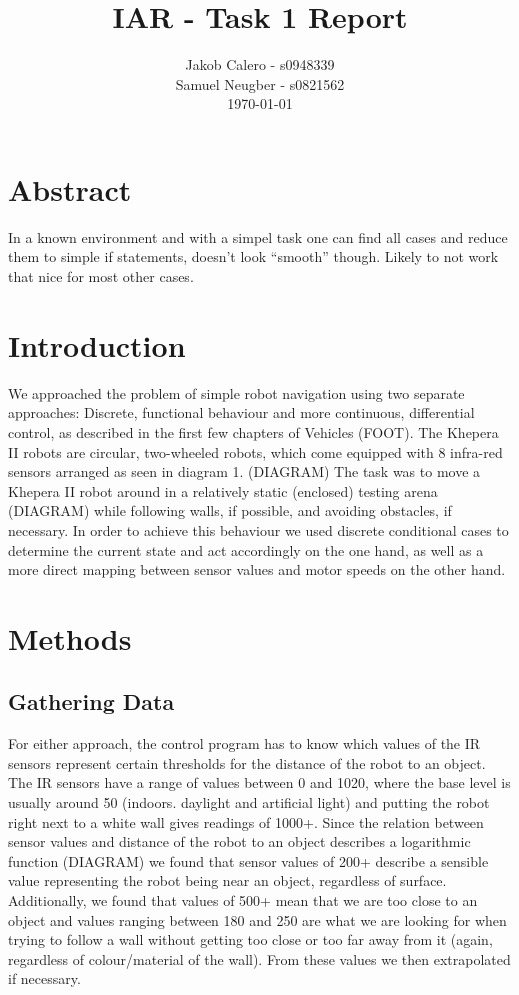 \documentclass[paper=a4, fontsize=12pt]{scrartcl}	%
\title{
\usefont{OT1}{bch}{b}{n}
\large IAR - Task 1 Report \\
}
\author{
\normalfont \normalsize
        Jakob Calero - s0948339\\[-3pt]\normalsize
	Samuel Neugber - s0821562\\[-3pt]\normalsize
        \today
}
\date{}
\numberwithin{equation}{section}		%
\numberwithin{figure}{section}			%
\numberwithin{table}{section}				%
\begin{document}
\maketitle
\section{Abstract}
In a known environment and with a simpel task one can find all cases and reduce them to simple if statements, doesn't look “smooth” though. Likely to not work that nice for most other cases.

\section{Introduction}
We approached the problem of simple robot navigation using two separate approaches: Discrete, functional behaviour and more continuous, differential control, as described in the first few chapters of Vehicles (FOOT). The Khepera II robots are circular, two-wheeled robots, which come equipped with 8 infra-red sensors arranged as seen in diagram 1. (DIAGRAM) The task was to move a Khepera II robot around in a relatively static (enclosed) testing arena (DIAGRAM) while following walls, if possible, and avoiding obstacles, if necessary. In order to achieve this behaviour we used discrete conditional cases to determine the current state and act accordingly on the one hand, as well as a more direct mapping between sensor values and motor speeds on the other hand.

\section{Methods}
\subsection{Gathering Data}
For either approach, the control program has to know which values of the IR sensors represent certain thresholds for the distance of the robot to an object. The IR sensors have a range of values between 0 and 1020, where the base level is usually around 50 (indoors. daylight and artificial light)  and putting the robot right next to a white wall gives readings of 1000+. Since the relation between sensor values and distance of the robot to an object describes a logarithmic function (DIAGRAM) we found that sensor values of 200+ describe a sensible value representing the robot being near an object, regardless of surface. Additionally, we found that values of 500+ mean that we are too close to an object and values ranging between 180 and 250 are what we are looking for when trying to follow a wall without getting too close or too far away from it (again, regardless of colour/material of the wall). From these values we then extrapolated if necessary.
\end{document}
